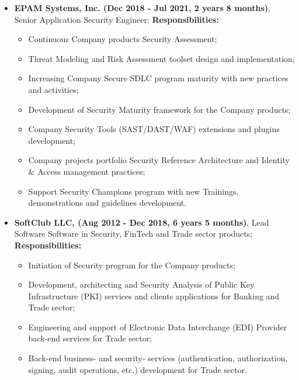 \documentclass[a4paper, 12pt]{article}
\newcommand{\position}[1]{
    \textbf{#1}}
\begin{document}
    \begin{itemize}
        \item \position{EPAM Systems, Inc. (Dec 2018 - Jul 2021, 2 years 8 months)}, Senior Application Security Engineer;
        \newline
        \newline
            \textbf{Responsibilities:}
			\begin{itemize}
				\item Continuous Company products Security Assessment;
  				\item Threat Modeling and Risk Assessment toolset design and implementation;
  				\item Increasing Company Secure SDLC program maturity with new practices and activities; 
  				\item Development of Security Maturity framework for the Company products;
  				\item Company Security Tools (SAST/DAST/WAF) extensions and plugins development;
  				\item Company projects portfolio Security Reference Architecture and Identity \& Access management practices;
  				 \item Support Security Champions program with new Trainings, demonstrations and guidelines development.
  				\newline
  				\newline
			\end{itemize}
    \end{itemize} 
            
    \begin{itemize}
        \item \position{SoftClub LLC, (Aug 2012 - Dec 2018, 6 years 5 months)}, Lead Software Software in Security, FinTech and Trade sector products;
        \newline
        \newline
            \textbf{Responsibilities:}
			\begin{itemize}
				\item Initiation of Security program for the Company products;
  				\item Development, architecting and Security Analysis of Public Key Infrastructure (PKI) services and clients applications for Banking and Trade sector;
  				\item Engineering and support of Electronic Data Interchange (EDI) Provider back-end services for Trade sector;
				\item Back-end business- and security- services (authentication, authorization, signing, audit operations, etc.) development for Trade sector.
			\end{itemize}
    \end{itemize}
    
\end{document}
